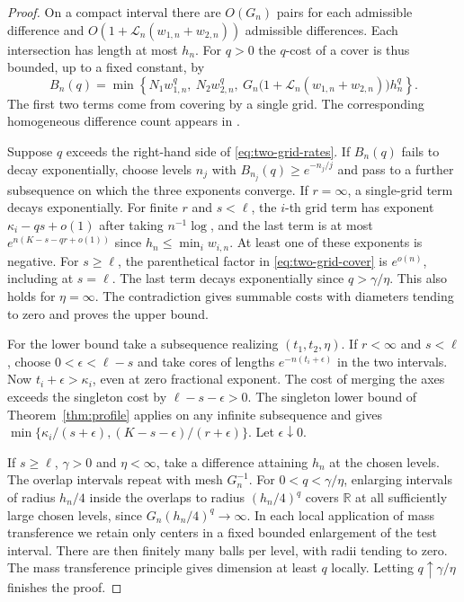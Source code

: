 \documentclass[11pt,reqno,a4paper]{amsart}
\theoremstyle{remark}
\numberwithin{equation}{section}
\begin{document}
\begin{proof}
On a compact interval there are \(O(G_n)\) pairs for each admissible
difference and \(O(1+\mathcal L_n(w_{1,n}+w_{2,n}))\) admissible
differences. Each intersection has length at most \(h_n\).
For \(q>0\) the \(q\)-cost of a cover is thus bounded, up to a fixed
constant, by
\begin{equation}\label{eq:two-grid-cover}
  B_n(q)=\min\!\left\{
    N_1w_{1,n}^q,\ N_2w_{2,n}^q,\
    G_n\bigl(1+\mathcal L_n(w_{1,n}+w_{2,n})\bigr)h_n^q
  \right\}.
\end{equation}
The first two terms come from covering by a single grid.
The corresponding homogeneous difference count appears in
\cite[\S\,4, Eqs.~(4.1)--(4.2)]{LLW}.

Suppose \(q\) exceeds the right-hand side of \eqref{eq:two-grid-rates}.
If \(B_n(q)\) fails to decay exponentially, choose levels \(n_j\) with
\(B_{n_j}(q)\ge e^{-n_j/j}\) and pass to a further subsequence on
which the three exponents converge.
If \(r=\infty\), a single-grid term decays exponentially. For finite
\(r\) and \(s<\ell\), the \(i\)-th grid term has exponent
\(\kappa_i-qs+o(1)\) after taking \(n^{-1}\log\), and the last term is
at most \(e^{n(K-s-qr+o(1))}\) since \(h_n\le\min_i w_{i,n}\).
At least one of these exponents is negative. For \(s\ge\ell\),
the parenthetical factor in \eqref{eq:two-grid-cover} is \(e^{o(n)}\),
including at \(s=\ell\). The last term decays exponentially since
\(q>\gamma/\eta\). This also holds for \(\eta=\infty\).
The contradiction gives summable costs with diameters tending to
zero and proves the upper bound.

For the lower bound take a subsequence realizing
\((t_1,t_2,\eta)\). If \(r<\infty\) and \(s<\ell\), choose
\(0<\epsilon<\ell-s\) and take cores of lengths
\(e^{-n(t_i+\epsilon)}\) in the two intervals. Now
\(t_i+\epsilon>\kappa_i\), even at zero fractional exponent.
The cost of merging the axes exceeds the singleton cost by
\(\ell-s-\epsilon>0\). The singleton lower bound of
Theorem~\ref{thm:profile} applies on any infinite subsequence and
gives \(\min\{\kappa_i/(s+\epsilon),(K-s-\epsilon)/(r+\epsilon)\}\).
Let \(\epsilon\downarrow0\).

If \(s\ge\ell\), \(\gamma>0\) and \(\eta<\infty\), take a difference
attaining \(h_n\) at the chosen levels. The overlap intervals repeat
with mesh \(G_n^{-1}\). For \(0<q<\gamma/\eta\), enlarging intervals
of radius \(h_n/4\) inside the overlaps to radius \((h_n/4)^q\)
covers \(\mathbb R\) at all sufficiently large chosen levels,
since \(G_n(h_n/4)^q\to\infty\). In each local application of mass transference we retain only centers in a fixed bounded enlargement of the test interval. There are then finitely many balls per level, with radii tending to zero. The mass transference principle
\cite[Theorem~2]{BV} gives dimension at least \(q\) locally.
Letting \(q\uparrow\gamma/\eta\) finishes the proof.
\end{proof}
\end{document}
